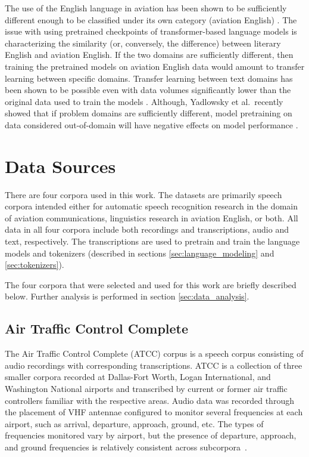 \documentclass[12pt]{article}
\begin{document}
The use of the English language in aviation has been shown to be sufficiently different enough to be classified under its own category (aviation
English) \cite{paltridge_handbook_2013}. The issue with using pretrained checkpoints of transformer-based language models is characterizing the
similarity (or, conversely, the difference) between literary English and aviation English. If the two domains are sufficiently different, then
training the pretrained models on aviation English data would amount to transfer learning between specific domains. Transfer learning between text
domains has been shown to be possible even with data volumes significantly lower than the original data used to train the models
\cite{raffel_exploring_2020}. Although, Yadlowsky et al.~recently showed that if problem domains are sufficiently different, model pretraining on data
considered out-of-domain will have negative effects on model performance \cite{yadlowsky_pretraining_2023}.


\section{Data Sources}\label{sec:data_source}
There are four corpora used in this work. The datasets are primarily speech corpora intended either for automatic speech recognition research in the
domain of aviation communications, linguistics research in aviation English, or both. All data in all four corpora include both recordings and
transcriptions, audio and text, respectively. The transcriptions are used to pretrain and train the language models and tokenizers (described in
sections \ref{sec:language_modeling} and \ref{sec:tokenizers}).

The four corpora that were selected and used for this work are briefly described below. Further analysis is performed in section \ref{sec:data_analysis}.

\subsection{Air Traffic Control Complete}\label{sec:atcc}
The Air Traffic Control Complete (ATCC) corpus is a speech corpus consisting of audio recordings with corresponding transcriptions.
ATCC is a collection of three smaller corpora recorded at Dallas-Fort Worth, Logan International, and Washington National airports and
transcribed by current or former air traffic controllers familiar with the respective areas. Audio data was recorded through the placement of VHF
antennae configured to monitor several frequencies at each airport, such as arrival, departure, approach, ground, etc. The types of frequencies
monitored vary by airport, but the presence of departure, approach, and ground frequencies is relatively consistent across subcorpora~\cite{godfrey_air_1994}.
\end{document}
